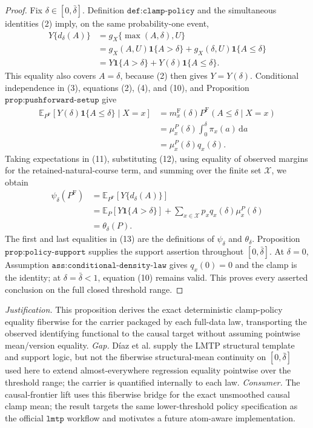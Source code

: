 \documentclass{article}
\begin{document}
\begin{proof}
Fix \(\delta\in[0,\bar\delta]\).  Definition \(\texttt{def:clamp-policy}\) and the simultaneous identities (2) imply, on the same probability-one event,
\[
\begin{aligned}
 Y\{d_\delta(A)\}
 &=g_X\{\max(A,\delta),U\}\\
 &=g_X(A,U)\mathbf 1\{A>\delta\}
   +g_X(\delta,U)\mathbf 1\{A\leq\delta\}\\
 &=Y\mathbf 1\{A>\delta\}+Y(\delta)\mathbf 1\{A\leq\delta\}.
\end{aligned}
\tag{11}
\]
This equality also covers \(A=\delta\), because (2) then gives \(Y=Y(\delta)\).  Conditional independence in (3), equations (2), (4), and (10), and Proposition \(\texttt{prop:pushforward-setup}\) give
\[
\begin{aligned}
 \mathbb E_{P^{\mathrm F}}[Y(\delta)\mathbf 1\{A\leq\delta\}\mid X=x]
 &=m_x^{\mathrm F}(\delta)P^{\mathrm F}(A\leq\delta\mid X=x)\\
 &=\mu_x^P(\delta)\int_0^\delta\pi_x(a)\,\mathrm da\\
 &=\mu_x^P(\delta)q_x(\delta).
\end{aligned}
\tag{12}
\]
Taking expectations in (11), substituting (12), using equality of observed margins for the retained-natural-course term, and summing over the finite set \(\mathcal X\), we obtain
\[
\begin{aligned}
 \psi_\delta(P^{\mathrm F})
 &=\mathbb E_{P^{\mathrm F}}[Y\{d_\delta(A)\}]\\
 &=\mathbb E_P[Y\mathbf 1\{A>\delta\}]
   +\sum_{x\in\mathcal X}p_xq_x(\delta)\mu_x^P(\delta)\\
 &=\theta_\delta(P).
\end{aligned}
\tag{13}
\]
The first and last equalities in (13) are the definitions of \(\psi_\delta\) and \(\theta_\delta\).  Proposition \(\texttt{prop:policy-support}\) supplies the support assertion throughout \([0,\bar\delta]\).  At \(\delta=0\), Assumption \(\texttt{ass:conditional-density-law}\) gives \(q_x(0)=0\) and the clamp is the identity; at \(\delta=\bar\delta<1\), equation (10) remains valid.  This proves every asserted conclusion on the full closed threshold range.
\end{proof}
\par\smallskip\noindent \textit{Justification.} This proposition derives the exact deterministic clamp-policy equality fiberwise for the carrier packaged by each full-data law, transporting the observed identifying functional to the causal target without assuming pointwise mean/version equality. \textit{Gap.} Díaz et al. supply the LMTP structural template and support logic, but not the fiberwise structural-mean continuity on \([0,\bar\delta]\) used here to extend almost-everywhere regression equality pointwise over the threshold range; the carrier is quantified internally to each law. \textit{Consumer.} The causal-frontier lift uses this fiberwise bridge for the exact unsmoothed causal clamp mean; the result targets the same lower-threshold policy specification as the official \(\texttt{lmtp}\) workflow and motivates a future atom-aware implementation.
\end{document}
